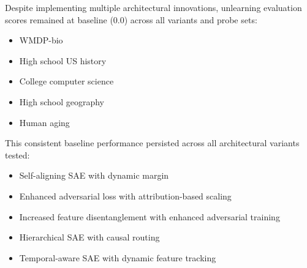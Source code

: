 \documentclass{article} %
\begin{document}
Despite implementing multiple architectural innovations, unlearning evaluation scores remained at baseline (0.0) across all variants and probe sets:

\begin{itemize}
    \item WMDP-bio
    \item High school US history
    \item College computer science
    \item High school geography
    \item Human aging
\end{itemize}

This consistent baseline performance persisted across all architectural variants tested:

\begin{itemize}
    \item Self-aligning SAE with dynamic margin
    \item Enhanced adversarial loss with attribution-based scaling
    \item Increased feature disentanglement with enhanced adversarial training
    \item Hierarchical SAE with causal routing
    \item Temporal-aware SAE with dynamic feature tracking
\end{itemize}
\end{document}
